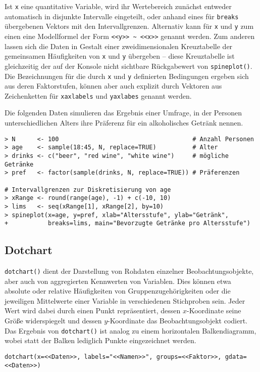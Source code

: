 Ist \lstinline!x! eine quantitative Variable, wird ihr Wertebereich zunächst entweder automatisch in disjunkte Intervalle eingeteilt, oder anhand eines für \lstinline!breaks! übergebenen Vektors mit den Intervallgrenzen. Alternativ kann für \lstinline!x! und \lstinline!y! zum einen eine Modellformel der Form \lstinline!<<y>> ~ <<x>>! genannt werden. Zum anderen lassen sich die Daten in Gestalt einer zweidimensionalen Kreuztabelle der gemeinsamen Häufigkeiten von \lstinline!x! und \lstinline!y! übergeben -- diese Kreuztabelle ist gleichzeitig der auf der Konsole nicht sichtbare Rückgabewert von \lstinline!spineplot()!. Die Bezeichnungen für die durch \lstinline!x! und \lstinline!y! definierten Bedingungen ergeben sich aus deren Faktorstufen, können aber auch explizit durch Vektoren aus Zeichenketten für \lstinline!xaxlabels! und \lstinline!yaxlabes! genannt werden.

Die folgenden Daten simulieren das Ergebnis einer Umfrage, in der Personen unterschiedlichen Alters ihre Präferenz für ein alkoholisches Getränk nennen.
\begin{lstlisting}
> N      <- 100                                     # Anzahl Personen
> age    <- sample(18:45, N, replace=TRUE)          # Alter
> drinks <- c("beer", "red wine", "white wine")     # mögliche Getränke
> pref   <- factor(sample(drinks, N, replace=TRUE)) # Präferenzen

# Intervallgrenzen zur Diskretisierung von age
> xRange <- round(range(age), -1) + c(-10, 10)
> lims   <- seq(xRange[1], xRange[2], by=10)
> spineplot(x=age, y=pref, xlab="Altersstufe", ylab="Getränk",
+           breaks=lims, main="Bevorzugte Getränke pro Altersstufe")
\end{lstlisting}

\subsection{Dotchart}

\lstinline!dotchart()! dient der Darstellung von Rohdaten einzelner Beobachtungsobjekte, aber auch von aggregierten Kennwerten von Variablen. Dies können etwa absolute oder relative Häufigkeiten von Gruppenzugehörigkeiten oder die jeweiligen Mittelwerte einer Variable in verschiedenen Stichproben sein. Jeder Wert wird dabei durch einen Punkt repräsentiert, dessen $x$-Koordinate seine Größe widerspiegelt und dessen $y$-Koordinate das Beobachtungsobjekt codiert. Das Ergebnis von \lstinline!dotchart()! ist analog zu einem horizontalen Balkendiagramm, wobei statt der Balken lediglich Punkte eingezeichnet werden.
\begin{lstlisting}
dotchart(x=<<Daten>>, labels="<<Namen>>", groups=<<Faktor>>, gdata=<<Daten>>)
\end{lstlisting}

